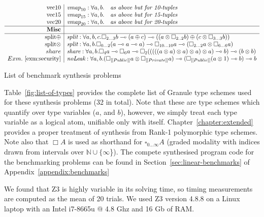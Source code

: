 \begin{table}
{{\begin{align*}
\begin{array}{r|rll}
\text{vec10} & \textit{vmap}_{10} : \forall a, b . & \textit{as above but for 10-tuples} \\
\text{vec15} & \textit{vmap}_{15} : \forall a, b . & \textit{as above but for 15-tuples} \\
\text{vec20} & \textit{vmap}_{20} : \forall a, b . & \textit{as above but for 20-tuples}\\ \hline
\textbf{Misc} \\ \hline
\text{split$\oplus$} & \multicolumn{2}{l}{ \textit{split} : \forall a, b, c .
\Box_{2...3} b \multimap (a \oplus c) \multimap (( a \otimes \Box_{2..2} b) \oplus (c \otimes \Box_{3...3} b))}
 \\
\text{split$\otimes$} & \multicolumn{2}{l}{\textit{split} : \forall a, b . 
\Box_{0...2} (a \multimap a \multimap a) \multimap \Box_{10...10} a \multimap (\Box_{2...2} a \otimes \Box_{6...6} a) 
}
\\
share & \multicolumn{2}{l}{\textit{share} : \forall a, b .  \Box_4 a \multimap \Box_6 a \multimap \Box_2 ((((( a \otimes a) \otimes a) \otimes a) \otimes a) \multimap b) \multimap (b \otimes b)}
\\
Exm.~\ref{exm:security}
& \multicolumn{2}{l}{\textit{noLeak} : \forall a, b . (\Box_{[[ Public ]]} a \otimes \Box_{[[ Private]]} a) \multimap (\Box_{[[ Public ]]}(a \otimes 1) \multimap b) \multimap b }
\end{array}
\end{align*}
}}
\caption{List of benchmark synthesis problems}
\label{fig:list-of-types}
\end{table}
%
Table~\ref{fig:list-of-types} provides the complete list of Granule type schemes
used for these synthesis problems (32 in total). Note that these are type
schemes which quantify over type variables ($a$, and $b$), however, we simply
treat each type variable as a logical atom, unifiable only with itself.
Chapter~\ref{chapter:extended} provides a proper treatment of synthesis from
Rank-1 polymorphic type schemes. Note also that $\Box A$ is used as shorthand
for $\square_{0...\infty} A$ (graded modality with indices drawn from intervals
over $\mathbb{N} \cup \{\infty$\}). The compete synthesised program code for the
benchmarking problems can be found in Section~\ref{sec:linear-benchmarks} of
Appendix~\ref{appendix:benchmarks}


We found that Z3 is highly variable in its solving time, so timing
measurements are computed as the mean of 20 trials. We used
Z3 version 4.8.8 on a Linux laptop with an Intel i7-8665u @ 4.8 Ghz
and 16 Gb of RAM.

